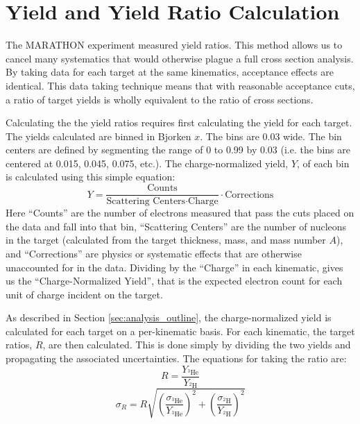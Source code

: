 \section{Yield and Yield Ratio Calculation}

The MARATHON experiment measured yield ratios. This method allows us to cancel many systematics that would otherwise plague a full cross section analysis. By taking data for each target at the same kinematics, acceptance effects are identical. This data taking technique means that with reasonable acceptance cuts, a ratio of target yields is wholly equivalent to the ratio of cross sections.

Calculating the the yield ratios requires first calculating the yield for each target. The yields calculated are binned in Bjorken $x$. The bins are 0.03 wide. The bin centers are defined by segmenting the range of 0 to 0.99 by 0.03 (i.e. the bins are centered at 0.015, 0.045, 0.075, etc.). The charge-normalized yield, $Y$, of each bin is calculated using this simple equation:
\begin{equation}
	Y = \frac{\text{Counts}}{\text{Scattering Centers} \cdot \text{Charge}} \cdot \text{Corrections}
	\label{eqn:yield}
\end{equation}
Here ``Counts'' are the number of electrons measured that pass the cuts placed on the data and fall into that bin, ``Scattering Centers'' are the number of nucleons in the target (calculated from the target thickness, mass, and mass number $A$), and ``Corrections'' are physics or systematic effects that are otherwise unaccounted for in the data. Dividing by the ``Charge'' in each kinematic, gives us the ``Charge-Normalized Yield'', that is the expected electron count for each unit of charge incident on the target.

As described in Section \ref{sec:analysis_outline}, the charge-normalized yield is calculated for each target on a per-kinematic basis. For each kinematic, the target ratios, $R$, are then calculated. This is done simply by dividing the two yields and propagating the associated uncertainties. The equations for taking the ratio are:
\begin{equation}
	R = \frac{Y_{^3\text{He}}}{Y_{^2\text{H}}}
\end{equation}
\begin{equation}
	\sigma_{R} = R\sqrt{\left(\frac{\sigma_{^3\text{He}}}{Y_{^3\text{He}}}\right)^2 + \left(\frac{\sigma_{^2\text{H}}}{Y_{^2\text{H}}}\right)^2}
\end{equation}

